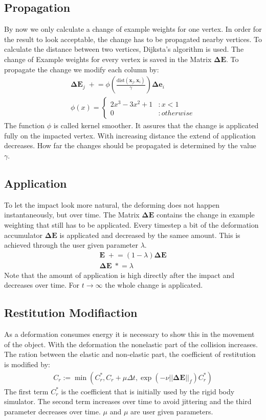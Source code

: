 \subsection{Propagation}
By now we only calculate a change of example weights for one vertex. In order for the result to look acceptable, the change has to be propagated nearby vertices. To calculate the distance between two vertices, Dijksta's algorithm is used. The change of Example weights for every vertex is saved in the Matrix $\bm{\Delta E}$. To propagate the change we modify each column by:
\begin{align}
\bm{\Delta E}_j \;+\!\!= \phi\left(\frac{\text{dist}(\bm x_j , \bm x_i)}{\gamma}\right) \bm{\Delta e}_i\\
\phi(x) =
\begin{cases}
	2x^3 - 3x^2 + 1 & : x< 1\\
	0               & : otherwise	
\end{cases}
\end{align}
The function $\phi$ is called kernel smoother. It assures that the change is applicated fully on the impacted vertex. With increasing distance the extend of application decreases. How far the changes should be propagated is determined by the value $\gamma$.
\subsection{Application}
To let the impact look more natural, the deforming does not happen instantaneously, but over time. The Matrix $\bm{\Delta E}$ contains the change in example weighting that still has to be applicated. Every timestep a bit of the deformation accumulator  $\bm{\Delta E}$ is applicated and decreased by the samee amount. This is achieved through the user given parameter $\lambda$.
\begin{align}
\bm E \;+\!\!= (1-\lambda)\bm{\Delta E} \\
\bm {\Delta E} \;*\!\!= \lambda
\end{align}
Note that the amount of application is high directly after the impact and decreases over time. For $t\rightarrow\infty$ the whole change is applicated.
\subsection{Restitution Modifiaction}
As a deformation consumes energy it is necessary to show this in the movement of the object. With the deformation the nonelastic part of the collision increases. The ration between the elastic and non-elastic part, the coefficient of restitution is modified by:
\begin{align}
C_r := \min(C_r^*, C_r + \mu \Delta t, \exp(-\nu||\bm{\Delta E}||_f)C_r^*)
\end{align}
The first term $C_r^*$ is the coefficient that is initially used by the rigid body simulator. The second term increases over time to avoid jittering and the third parameter decreases over time. $\mu$ and $\mu$ are user given parameters.

